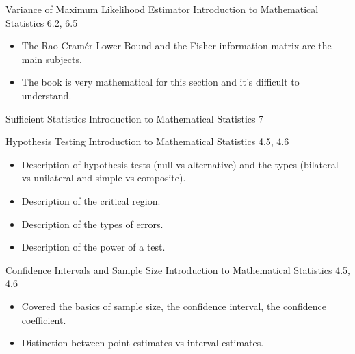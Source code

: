 \begin{CHPT_SUMM_AUTO_NUMB}[label = {L.-31}]{Variance of Maximum Likelihood Estimator}
Introduction to Mathematical Statistics 6.2, 6.5

\tcbline

\begin{itemize}
	\item	The Rao-Cramér Lower Bound and the Fisher information matrix are the main subjects.
	\item	The book is very mathematical for this section and it's difficult to understand.
\end{itemize}
\end{CHPT_SUMM_AUTO_NUMB}

\begin{CHPT_SUMM_AUTO_NUMB}[label = {L.-32}]{Sufficient Statistics}
Introduction to Mathematical Statistics 7

\tcbline


\end{CHPT_SUMM_AUTO_NUMB}

\begin{CHPT_SUMM_AUTO_NUMB}[label = {L.-33}]{Hypothesis Testing}
Introduction to Mathematical Statistics 4.5, 4.6

\tcbline

\begin{itemize}
	\item	Description of hypothesis tests (null vs alternative) and the types (bilateral vs unilateral and simple vs composite).
	\item	Description of the critical region.
	\item	Description of the types of errors.
	\item	Description of the power of a test.
\end{itemize}
\end{CHPT_SUMM_AUTO_NUMB}

\begin{CHPT_SUMM_AUTO_NUMB}[label = {L.-34}]{Confidence Intervals and Sample Size}
Introduction to Mathematical Statistics 4.5, 4.6

\tcbline

\begin{itemize}
	\item	Covered the basics of sample size, the confidence interval, the confidence coefficient.
	\item	Distinction between point estimates vs interval estimates.
\end{itemize}
\end{CHPT_SUMM_AUTO_NUMB}

